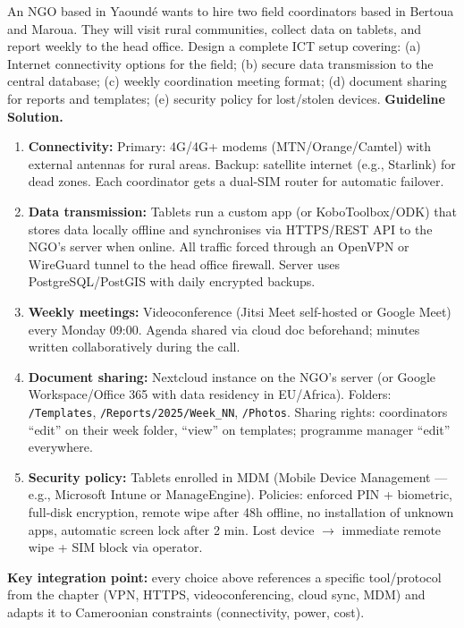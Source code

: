\documentclass[11pt]{article}
\newcommand{\cle}[1]{{\popxbold\color{popdark}#1}}
\newcounter{popsec}
\newcounter{popsub}
\newcommand{\courssub}[1]{%
  \stepcounter{popsub}%
  \par\vspace{9pt}\noindent{\popxbold\fontsize{11.5}{13}\selectfont\color{popink}{\color{poporange}\thepopsec.\thepopsub}\hspace{6pt}#1}\par\nopagebreak\vspace{4pt}
}
\begin{document}
\courssub{Integration Activity: End-to-End Scenario}

\begin{experience}
An NGO based in Yaoundé wants to hire two field coordinators based in Bertoua and Maroua. They will visit rural communities, collect data on tablets, and report weekly to the head office. Design a complete ICT setup covering: (a) Internet connectivity options for the field; (b) secure data transmission to the central database; (c) weekly coordination meeting format; (d) document sharing for reports and templates; (e) security policy for lost/stolen devices.
\tcblower
\textbf{Guideline Solution.}
\begin{enumerate}
\item \textbf{Connectivity:} Primary: 4G/4G+ modems (MTN/Orange/Camtel) with external antennas for rural areas. Backup: satellite internet (e.g., Starlink) for dead zones. Each coordinator gets a dual-SIM router for automatic failover.
\item \textbf{Data transmission:} Tablets run a custom app (or KoboToolbox/ODK) that stores data locally offline and synchronises via HTTPS/REST API to the NGO's server when online. All traffic forced through an \cle{OpenVPN} or \cle{WireGuard} tunnel to the head office firewall. Server uses PostgreSQL/PostGIS with daily encrypted backups.
\item \textbf{Weekly meetings:} Videoconference (Jitsi Meet self-hosted or Google Meet) every Monday 09:00. Agenda shared via cloud doc beforehand; minutes written collaboratively during the call.
\item \textbf{Document sharing:} Nextcloud instance on the NGO's server (or Google Workspace/Office 365 with data residency in EU/Africa). Folders: \texttt{/Templates}, \texttt{/Reports/2025/Week\_NN}, \texttt{/Photos}. Sharing rights: coordinators ``edit'' on their week folder, ``view'' on templates; programme manager ``edit'' everywhere.
\item \textbf{Security policy:} Tablets enrolled in MDM (Mobile Device Management --- e.g., Microsoft Intune or ManageEngine). Policies: enforced PIN + biometric, full-disk encryption, remote wipe after 48h offline, no installation of unknown apps, automatic screen lock after 2 min. Lost device $\rightarrow$ immediate remote wipe + SIM block via operator.
\end{enumerate}
\textbf{Key integration point:} every choice above references a specific tool/protocol from the chapter (VPN, HTTPS, videoconferencing, cloud sync, MDM) and adapts it to Cameroonian constraints (connectivity, power, cost).
\end{experience}
\end{document}
